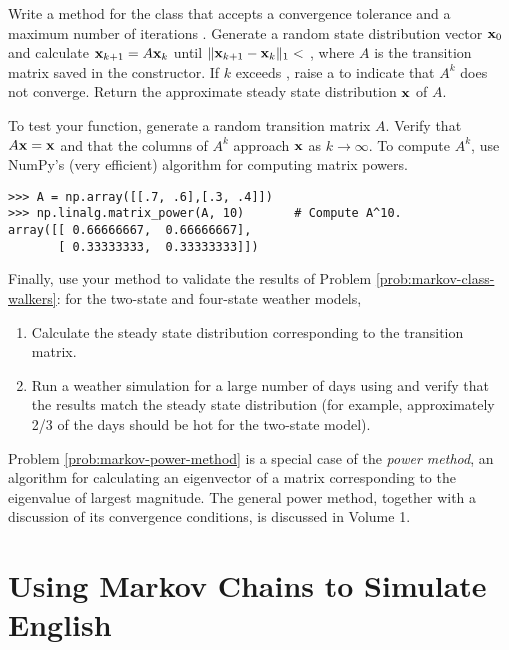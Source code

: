 \begin{problem} %
Write a method for the  class that accepts a convergence tolerance  and a maximum number of iterations .
Generate a random state distribution vector $\mathbf{x}_{0}$ and calculate $\mathbf{x}_{k+1} = A\mathbf{x}_k$ until $\|\mathbf{x}_{k+1} - \mathbf{x}_k\|_1 <$ , where $A$ is the transition matrix saved in the constructor.
If $k$ exceeds , raise a  to indicate that $A^k$ does not converge.
Return the approximate steady state distribution $\mathbf{x}$ of $A$.

To test your function, generate a random transition matrix $A$.
Verify that $A\mathbf{x} = \mathbf{x}$ and that the columns of $A^k$ approach $\mathbf{x}$ as $k\rightarrow\infty$.
To compute $A^k$, use NumPy's (very efficient) algorithm for computing matrix powers. %

\begin{lstlisting}
>>> A = np.array([[.7, .6],[.3, .4]])
>>> np.linalg.matrix_power(A, 10)       # Compute A^10.
array([[ 0.66666667,  0.66666667],
       [ 0.33333333,  0.33333333]])
\end{lstlisting}
%
Finally, use your method to validate the results of Problem \ref{prob:markov-class-walkers}:
for the two-state and four-state weather models,
\begin{enumerate}
    \item Calculate the steady state distribution corresponding to the transition matrix.
    \item Run a weather simulation for a large number of days using  and verify that the results match the steady state distribution (for example, approximately 2/3 of the days should be hot for the two-state model).
\end{enumerate}
\label{prob:markov-power-method}
\end{problem}

\begin{info}
Problem \ref{prob:markov-power-method} is a special case of the \emph{power method}, an algorithm for calculating an eigenvector of a matrix corresponding to the eigenvalue of largest magnitude.
The general power method, together with a discussion of its convergence conditions, is discussed in Volume 1.
\end{info}

\section*{Using Markov Chains to Simulate English} %

